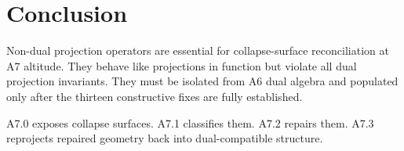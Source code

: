 \documentclass[11pt]{article}
\begin{document}
\section{Conclusion}

Non-dual projection operators are essential for collapse-surface reconciliation
at A7 altitude. They behave like projections in function but violate all dual
projection invariants. They must be isolated from A6 dual algebra and populated
only after the thirteen constructive fixes are fully established.

A7.0 exposes collapse surfaces.  
A7.1 classifies them.  
A7.2 repairs them.  
A7.3 reprojects repaired geometry back into dual-compatible structure.
\end{document}
